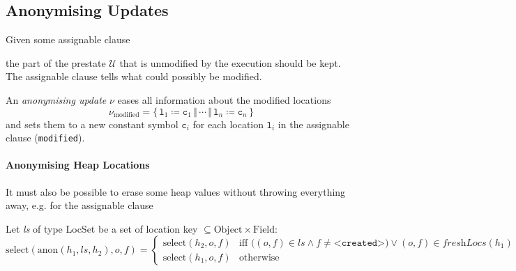 		\subsection{Anonymising Updates}
			\label{sec:anonUpdate}
		
			Given some assignable clause
			\begin{center}
			\end{center}
			the part of the prestate \(\mathcal{U}\) that is unmodified by the execution should be kept. The assignable clause tells what could possibly be modified.
			
			An \textit{anonymising update} \( \nu \) eases all information about the modified locations
			\begin{equation*}
				\nu_\textrm{modified} = \{\, \texttt{l}_1 \coloneqq \texttt{c}_1 \,\Vert\, \cdots \,\Vert\, \texttt{l}_n \coloneqq \texttt{c}_n \,\}
			\end{equation*}
			and sets them to a new constant symbol \( \texttt{c}_i \) for each location \( \texttt{l}_i \) in the assignable clause (\texttt{modified}).
			
			\paragraph{Anonymising Heap Locations}
				It must also be possible to erase some heap values without throwing everything away, e.g. for the assignable clause
				\begin{center}
				\end{center}
			
			
				Let \textit{ls} of type LocSet be a set of location key \( \subseteq \textrm{Object} \times \textrm{Field} \):
				\begin{equation*}
					\textrm{select}(\textrm{anon}(h_1, \textit{ls}, h_2), o, f) =
						\begin{cases}
							\textrm{select}(h_2, o, f) & \textrm{iff } \big( (o, f) \in \textit{ls} \land f \neq \texttt{<created>} \big) \lor (o, f) \in \textit{freshLocs}(h_1) \\
							\textrm{select}(h_1, o, f) & \textrm{otherwise}
						\end{cases}
				\end{equation*}
	
